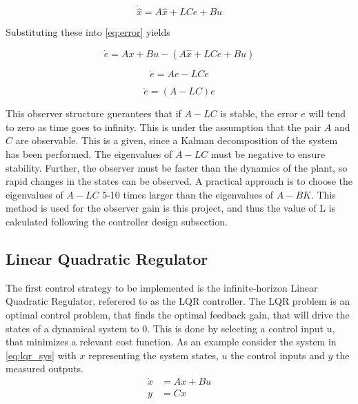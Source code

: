 \begin{equation}
	\dot{\hat{x}} = A\hat{x} + LCe + Bu
\end{equation}

Substituting these into \cref{eq:error} yields

\begin{equation}
	\dot{e} = Ax + Bu - ( A\hat{x} + LCe  + Bu)
\end{equation}

\begin{equation}
	\dot{e} = Ae - LCe
\end{equation}

\begin{equation} \label{eq:obs_error_dot}
	\dot{e} = (A - LC)e
\end{equation}

This observer structure guerantees that if $A-LC$ is stable, the error $e$ will tend to zero as time goes to infinity. This is under the assumption that the pair $A$ and $C$ are observable. This is a given, since a Kalman decomposition of the system has been performed. The eigenvalues of $A-LC$ must be negative to ensure stability. Further, the observer must be faster than the dynamics of the plant, so rapid changes in the states can be observed. A practical approach is to choose the eigenvalues of $A-LC$ 5-10 times larger than the eigenvalues of $A-BK$. This method is used for the observer gain is this project, and thus the value of L is calculated following the controller design subsection.

\subsection{Linear Quadratic Regulator} \label{sec:linear-quadratic-regulator}
The first control strategy to be implemented is the infinite-horizon Linear Quadratic Regulator, referered to as the LQR controller. The LQR problem is an optimal control problem, that finds the optimal feedback gain, that will drive the states of a dynamical system to 0. This is done by selecting a control input u, that minimizes a relevant cost function. As an example consider the system in \cref{eq:lqr_sys} with $x$ representing the system states, $u$ the control inputs and $y$ the measured outputs.\\

\begin{equation} \label{eq:lqr_sys}
	\begin{split}
		\dot{x} 	& = Ax + Bu \\
		y 	& = Cx
	\end{split}
\end{equation}

